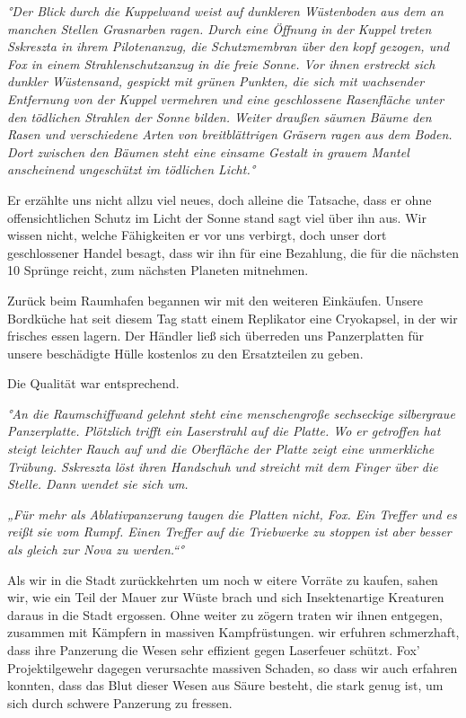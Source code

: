 \documentclass[11pt]{scrartcl}
\begin{document}
\emph{°Der Blick durch die Kuppelwand weist auf dunkleren Wüstenboden
aus dem an manchen Stellen Grasnarben ragen. Durch eine Öffnung in der
Kuppel treten Sskreszta in ihrem Pilotenanzug, die Schutzmembran über
den kopf gezogen, und Fox in einem Strahlenschutzanzug in die freie
Sonne. Vor ihnen erstreckt sich dunkler Wüstensand, gespickt mit grünen
Punkten, die sich mit wachsender Entfernung von der Kuppel vermehren und
eine geschlossene Rasenfläche unter den tödlichen Strahlen der Sonne
bilden. Weiter draußen säumen Bäume den Rasen und verschiedene Arten von
breitblättrigen Gräsern ragen aus dem Boden. Dort zwischen den Bäumen
steht eine einsame Gestalt in grauem Mantel anscheinend ungeschützt im
tödlichen Licht.°}

Er erzählte uns nicht allzu viel neues, doch alleine die Tatsache, dass
er ohne offensichtlichen Schutz im Licht der Sonne stand sagt viel über
ihn aus. Wir wissen nicht, welche Fähigkeiten er vor uns verbirgt, doch
unser dort geschlossener Handel besagt, dass wir ihn für eine Bezahlung,
die für die nächsten 10 Sprünge reicht, zum nächsten Planeten mitnehmen.

Zurück beim Raumhafen begannen wir mit den weiteren Einkäufen. Unsere
Bordküche hat seit diesem Tag statt einem Replikator eine Cryokapsel, in
der wir frisches essen lagern. Der Händler ließ sich überreden uns
Panzerplatten für unsere beschädigte Hülle kostenlos zu den Ersatzteilen
zu geben.

Die Qualität war entsprechend.

\emph{°An die Raumschiffwand gelehnt steht eine menschengroße
sechseckige silbergraue Panzerplatte. Plötzlich trifft ein Laserstrahl
auf die Platte. Wo er getroffen hat steigt leichter Rauch auf und die
Oberfläche der Platte zeigt eine unmerkliche Trübung. Sskreszta löst
ihren Handschuh und streicht mit dem Finger über die Stelle. Dann wendet
sie sich um.}

\emph{„Für mehr als Ablativpanzerung taugen die Platten nicht, Fox. Ein
Treffer und es reißt sie vom Rumpf. Einen Treffer auf die Triebwerke zu
stoppen ist aber besser als gleich zur Nova zu werden.``°}

Als wir in die Stadt zurückkehrten um noch w eitere Vorräte zu kaufen,
sahen wir, wie ein Teil der Mauer zur Wüste brach und sich
Insektenartige Kreaturen daraus in die Stadt ergossen. Ohne weiter zu
zögern traten wir ihnen entgegen, zusammen mit Kämpfern in massiven
Kampfrüstungen. wir erfuhren schmerzhaft, dass ihre Panzerung die Wesen
sehr effizient gegen Laserfeuer schützt. Fox' Projektilgewehr dagegen
verursachte massiven Schaden, so dass wir auch erfahren konnten, dass
das Blut dieser Wesen aus Säure besteht, die stark genug ist, um sich
durch schwere Panzerung zu fressen.
\end{document}

